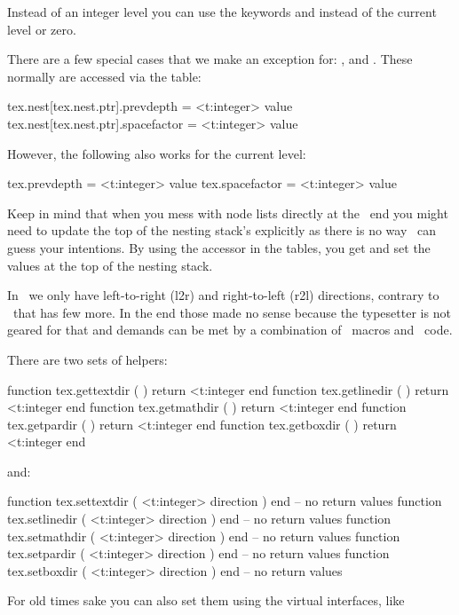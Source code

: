 Instead of an integer level you can use the keywords  and 
instead of the current level or zero.

There are a few special cases that we make an exception for: ,
 and . These normally are accessed via the
 table:

\starttyping
tex.nest[tex.nest.ptr].prevdepth   = <t:integer> value
tex.nest[tex.nest.ptr].spacefactor = <t:integer> value
\stoptyping

However, the following also works for the current level:

\starttyping
tex.prevdepth   = <t:integer> value
tex.spacefactor = <t:integer> value
\stoptyping

Keep in mind that when you mess with node lists directly at the \LUA\ end you
might need to update the top of the nesting stack's \type {\prevdepth} explicitly
as there is no way \LUATEX\ can guess your intentions. By using the accessor in
the  tables, you get and set the values at the top of the nesting
stack.

\stopsubsection

\startsubsection[title={Directions}]

In \LUAMETATEX\ we only have left-to-right (l2r) and right-to-left (r2l)
directions, contrary to \LUATEX\ that has few more. In the end those made no
sense because the typesetter is not geared for that and demands can be met by a
combination of \TEX\ macros and \LUA\ code.

There are two sets of helpers:

\starttyping[option=LUA]
function tex.gettextdir ( ) return <t:integer end
function tex.getlinedir ( ) return <t:integer end
function tex.getmathdir ( ) return <t:integer end
function tex.getpardir  ( ) return <t:integer end
function tex.getboxdir  ( ) return <t:integer end
\stoptyping

and:

\starttyping[option=LUA]
function tex.settextdir ( <t:integer> direction ) end -- no return values
function tex.setlinedir ( <t:integer> direction ) end -- no return values
function tex.setmathdir ( <t:integer> direction ) end -- no return values
function tex.setpardir  ( <t:integer> direction ) end -- no return values
function tex.setboxdir  ( <t:integer> direction ) end -- no return values
\stoptyping

For old times sake you can also set them using the virtual interfaces, like

